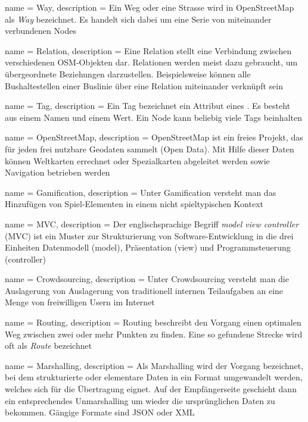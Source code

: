  {
	name = Way,
	description = {Ein Weg oder eine Strasse wird in OpenStreetMap als \emph{Way} bezeichnet. Es handelt sich dabei um eine Serie von miteinander verbundenen Nodes}
}

 {
	name = Relation,
	description = {Eine Relation stellt eine Verbindung zwischen verschiedenen OSM-Objekten dar. Relationen werden meist dazu gebraucht, um übergeordnete Beziehungen darzustellen. Beispielsweise können alle Bushaltestellen einer Buslinie über eine Relation miteinander verknüpft sein}
}

 {
	name = Tag,
	description = {Ein Tag bezeichnet ein Attribut eines . Es besteht aus einem Namen und einem Wert. Ein \gls{Node} kann beliebig viele Tags beinhalten}
}

 {
	name = OpenStreetMap,
	description = {OpenStreetMap ist ein freies Projekt, das für jeden frei nutzbare Geodaten sammelt (Open Data). Mit Hilfe dieser Daten können Weltkarten errechnet oder Spezialkarten abgeleitet werden sowie Navigation betrieben werden}
}

 {
	name = Gamification,
	description = {Unter Gamification versteht man das Hinzufügen von Spiel-Elementen in einem nicht spieltypischen Kontext\cite{for-the-win}}
}

 {
	name = MVC,
	description = {Der englischsprachige Begriff \emph{model view controller} (MVC) ist ein Muster zur Strukturierung von Software-Entwicklung in die drei Einheiten Datenmodell (model), Präsentation (view) und Programmsteuerung (controller)\cite{patterns}}
}

 {
	name = Crowdsourcing,
	description = {Unter Crowdsourcing versteht man die Auslagerung von  Auslagerung von traditionell internen Teilaufgaben an eine Menge von freiwilligen Usern im Internet\cite{crowdsourcing}}
}

 {
	name = Routing,
	description = {Routing beschreibt den Vorgang einen optimalen Weg zwischen zwei oder mehr Punkten zu finden. Eine so gefundene Strecke wird oft als \emph{Route} bezeichnet}
}

 {
	name = Marshalling,
	description = {Als Marshalling wird der Vorgang bezeichnet, bei dem strukturierte oder elementare Daten in ein Format umgewandelt werden, welches sich für die Übertragung eignet\cite{marshalling}. Auf der Empfängerseite geschieht dann ein entsprechendes Unmarshalling um wieder die ursprünglichen Daten zu bekommen.
Gängige Formate sind JSON oder XML}
}